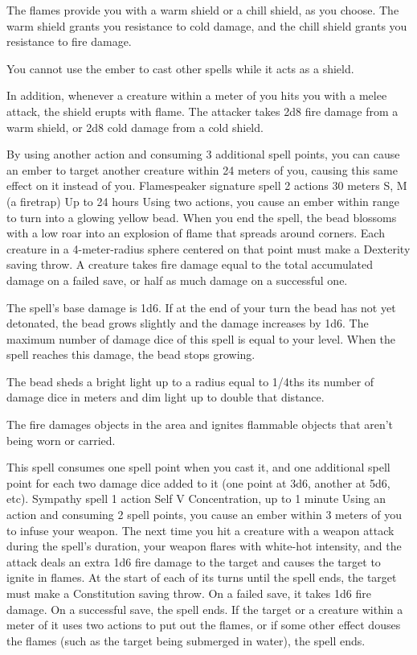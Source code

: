         The flames provide you with a warm shield or a chill shield, as you choose.
        The warm shield grants you resistance to cold damage, and the chill shield grants you resistance to fire damage.

        You cannot use the ember to cast other spells while it acts as a shield.

        In addition, whenever a creature within a meter of you hits you with a melee attack, the shield erupts with flame.
        The attacker takes 2d8 fire damage from a warm shield, or 2d8 cold damage from a cold shield.

        By using another action and consuming 3 additional spell points, you can cause an ember to target another creature within 24 meters of you, causing this same effect on it instead of you.
        {Flamespeaker signature spell}
        {2 actions}
        {30 meters}
        {S, M (a firetrap)}
        {Up to 24 hours}
        Using two actions, you cause an ember within range to turn into a glowing yellow bead.
        When you end the spell, the bead blossoms with a low roar into an explosion of flame that spreads around corners.
        Each creature in a 4-meter-radius sphere centered on that point must make a Dexterity saving throw.
        A creature takes fire damage equal to the total accumulated damage on a failed save, or half as much damage on a successful one.

        The spell's base damage is 1d6.
        If at the end of your turn the bead has not yet detonated, the bead grows slightly and the damage increases by 1d6.
        The maximum number of damage dice of this spell is equal to your level.
        When the spell reaches this damage, the bead stops growing.

        The bead sheds a bright light up to a radius equal to 1/4ths its number of damage dice in meters and dim light up to double that distance.

        The fire damages objects in the area and ignites flammable objects that aren't being worn or carried.

        This spell consumes one spell point when you cast it, and one additional spell point for each two damage dice added to it (one point at 3d6, another at 5d6, etc).
        {Sympathy spell}
        {1 action}
        {Self}
        {V}
        {Concentration, up to 1 minute}
        Using an action and consuming 2 spell points, you cause an ember within 3 meters of you to infuse your weapon.
        The next time you hit a creature with a weapon attack during the spell's duration, your weapon flares with white-hot intensity, and the attack deals an extra 1d6 fire damage to the target and causes the target to ignite in flames.
        At the start of each of its turns until the spell ends, the target must make a Constitution saving throw.
        On a failed save, it takes 1d6 fire damage.
        On a successful save, the spell ends.
        If the target or a creature within a meter of it uses two actions to put out the flames, or if some other effect douses the flames (such as the target being submerged in water), the spell ends.

